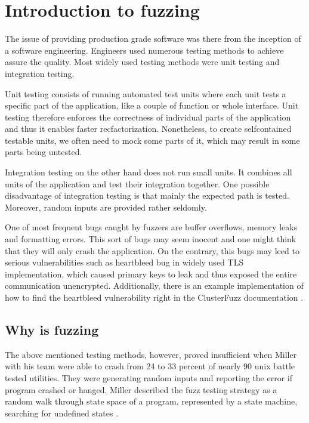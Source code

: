 \chapter{Introduction to fuzzing}
\label{cha:Introduction to fuzzing}
The issue of providing production grade software was there from the inception of a software engineering. Engineers used numerous testing methods to achieve assure the quality. Most widely used testing methods were unit testing and integration testing.

Unit testing consists of running automated test units where each unit tests a specific part of the application, like a couple of function or whole interface. Unit testing therefore enforces the correctness of individual parts of the application and thus it enables faster recfactorization. Nonetheless, to create selfcontained testable units, we often need to mock some parts of it, which may result in some parts being untested.

Integration testing on the other hand does not run small units. It combines all units of the application and test their integration together. One possible disadvantage of integration testing is that mainly the expected path is tested. Moreover, random inputs are provided rather seldomly.

One of most frequent bugs caught by fuzzers are buffer overflows, memory leaks and formatting errors. This sort of bugs may seem inocent and one might think that they will only crash the application. On the contrary, this bugs may leed to serious vulnerabilities such as heartbleed bug \cite{heartbleed2020bug} in widely used TLS implementation, which caused primary keys to leak and thus exposed the entire communication unencrypted. Additionally, there is an example implementation of how to find the heartbleed vulnerability right in the ClusterFuzz documentation \cite{clusterfuzz2020heartbleed}.

\section{Why is fuzzing}
The above mentioned testing methods, however, proved insufficient when Miller with his team were able to crash from 24 to 33 percent of nearly 90 unix battle tested utilities. They were generating random inputs and reporting the error if program crashed or hanged. Miller described the fuzz testing strategy as a random walk through state space of a program, represented by a state machine, searching for undefined states \cite{miller1990empirical}.

